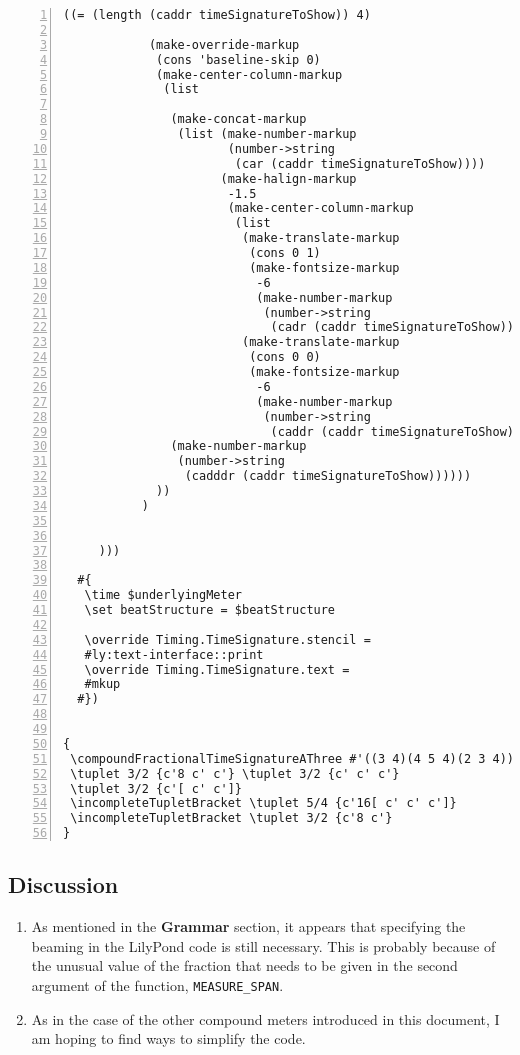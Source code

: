 \begin{Verbatim}[numbers=left,xleftmargin=5mm]
           ((= (length (caddr timeSignatureToShow)) 4)

            (make-override-markup
             (cons 'baseline-skip 0)
             (make-center-column-markup
              (list

               (make-concat-markup
                (list (make-number-markup
                       (number->string
                        (car (caddr timeSignatureToShow))))
                      (make-halign-markup
                       -1.5
                       (make-center-column-markup
                        (list
                         (make-translate-markup
                          (cons 0 1)
                          (make-fontsize-markup
                           -6
                           (make-number-markup
                            (number->string
                             (cadr (caddr timeSignatureToShow))))))
                         (make-translate-markup
                          (cons 0 0)
                          (make-fontsize-markup
                           -6
                           (make-number-markup
                            (number->string
                             (caddr (caddr timeSignatureToShow)))))))))))
               (make-number-markup
                (number->string
                 (cadddr (caddr timeSignatureToShow))))))
             ))
           )


     )))

  #{
   \time $underlyingMeter
   \set beatStructure = $beatStructure

   \override Timing.TimeSignature.stencil =
   #ly:text-interface::print
   \override Timing.TimeSignature.text =
   #mkup
  #})


{
 \compoundFractionalTimeSignatureAThree #'((3 4)(4 5 4)(2 3 4)) 67/60 3,3,3,4,2
 \tuplet 3/2 {c'8 c' c'} \tuplet 3/2 {c' c' c'}
 \tuplet 3/2 {c'[ c' c']}
 \incompleteTupletBracket \tuplet 5/4 {c'16[ c' c' c']}
 \incompleteTupletBracket \tuplet 3/2 {c'8 c'}
}
\end{Verbatim}



\subsection{Discussion}
\label{sec:compoundfractionalmeter_discussion_two}
\begin{enumerate}
\item As mentioned in the \textbf{Grammar} section, it appears that specifying the beaming in the LilyPond code is still necessary. This is probably because of the unusual value of the fraction that needs to be given in the second argument of the function, \verb|MEASURE_SPAN|.
\item As in the case of the other compound meters introduced in this document, I am hoping to find ways to simplify the code. 
\end{enumerate}




